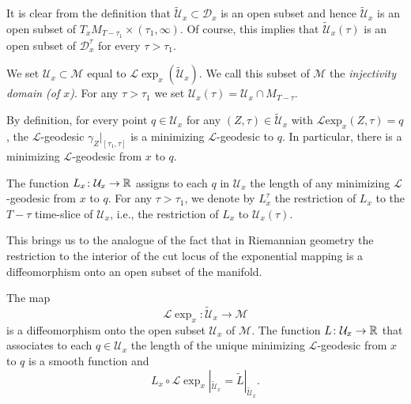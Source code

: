 It is clear from the definition that $\widetilde{\mathcal
U}_x\subset {\mathcal D}_x$ is an open subset and hence
$\widetilde{\mathcal U}_x$ is an open subset of
$T_xM_{T-\tau_1}\times (\tau_1,\infty)$. Of course, this implies
that $\widetilde {\mathcal U}_x(\tau)$ is an open subset of
${\mathcal D}_x^\tau$ for every $\tau>\tau_1$.



\begin{definition}\label{def:l-injectivity-domain}
\label{L_x}

We set ${\mathcal U}_x\subset {\mathcal M}$ equal to $ {\mathcal L}\exp_x(\widetilde{\mathcal
U}_x)$. We call this subset of ${\mathcal M}$ the {\em injectivity
domain (of $x$)}.
 For any
$\tau>\tau_1$ we set ${\mathcal U}_x(\tau)={\mathcal U}_x\cap
M_{T-\tau}$.
\end{definition}

By definition, for every point $q\in {\mathcal U}_x$ for any
$(Z,\tau)\in \widetilde{\mathcal U}_x$ with ${\mathcal L}\mathrm{exp}_x(Z,\tau)=q$, the ${\mathcal L}$-geodesic
$\gamma_{Z}|_{[\tau_1,\tau]}$  is a minimizing
 ${\mathcal L}$-geodesic to $q$. In particular, there is a minimizing
 ${\mathcal L}$-geodesic from $x$ to $q$.

\begin{definition}\label{def:minimal-l-length-function}

The function $L_x\colon {\mathcal U}_x\to \mathbb{R}$
assigns to each $q$ in ${\mathcal U}_x$ the length of any minimizing
${\mathcal L}$-geodesic from $x$ to $q$. For any $\tau>\tau_1$, we
denote by $L_x^\tau$ the restriction of $L_x$
to the $T-\tau$ time-slice of ${\mathcal U}_x$, i.e., the
restriction of $L_x$ to ${\mathcal U}_x(\tau)$.
\end{definition}

 This brings us to the
analogue of the fact that in Riemannian geometry the restriction to
the interior of the cut locus of the exponential mapping is a
diffeomorphism onto an open subset of the manifold.


\begin{proposition}\label{prop:l-exponential-diffeomorphism}
\label{diffeo}

The map
$${\mathcal L}\exp_x\colon\widetilde {\mathcal
U}_x\to {\mathcal M}$$ is a diffeomorphism onto the open subset
${\mathcal U}_x$ of ${\mathcal M}$. The function $L\colon {\mathcal
U}_x\to \mathbb{R}$ that associates to each $q\in {\mathcal U}_x$ the
length of the unique minimizing ${\mathcal L}$-geodesic from $x$ to
$q$ is a smooth function and
$$L_x\circ {\mathcal L}\exp_x|_{\widetilde{\mathcal U}_x}
=\widetilde L|_{\widetilde{\mathcal U}_x}.$$
\end{proposition}



